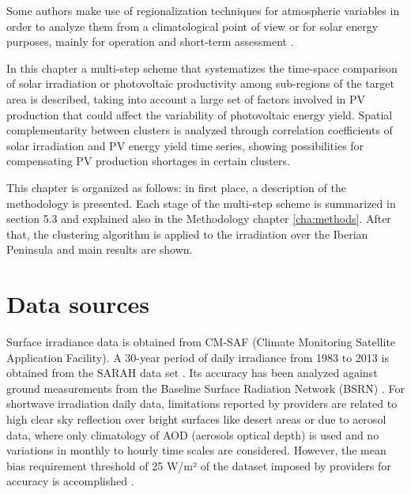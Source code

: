 Some authors make use of regionalization techniques for atmospheric variables in order to analyze them from a climatological point of view \cite*{Argueso2011} or for solar energy purposes, mainly for operation and short-term assessment \cite*{Zagouras2013, Zagouras2014, Zagouras2014b}.

In this chapter a multi-step scheme that systematizes the time-space comparison of solar irradiation or photovoltaic productivity among sub-regions of the target area is described, taking into account a large set of factors involved in PV production that could affect the variability of photovoltaic energy yield. Spatial complementarity between clusters is analyzed through correlation coefficients of solar irradiation and PV energy yield time series, showing possibilities for compensating PV production shortages in certain clusters.


This chapter is organized as follows: in first place, a description of the methodology is presented. Each stage of the multi-step scheme is summarized in section 5.3 and explained also in the Methodology chapter \ref{cha:methods}. After that, the clustering algorithm is applied to the irradiation over the Iberian Peninsula and main results are shown.

\section{Data sources}

Surface irradiance data is obtained from CM-SAF (Climate Monitoring Satellite Application Facility). A 30-year period of daily irradiance from 1983 to 2013 is obtained from the SARAH data set \cite*{Muller2015}. Its accuracy has been analyzed \cite*{Posselt2012, Muller2015} against ground measurements from the Baseline Surface Radiation Network (BSRN) \cite*{ohmura1998}. For shortwave irradiation daily data, limitations reported by providers are related to high clear sky reflection over bright surfaces like desert areas or due to aerosol data, where only climatology of AOD (aerosols optical depth) is used and no variations in monthly to hourly time scales are considered. However, the mean bias requirement threshold of 25 W/m² of the dataset imposed by providers for accuracy is accomplished \cite*{Posselt2012, Muller2015}. 

